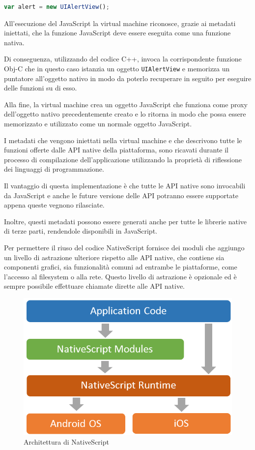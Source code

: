 \begin{lstlisting}[language=JavaScript, caption=Esempio di creazione di un oggetto nativo con NativeScript]
var alert = new UIAlertView();
\end{lstlisting}

All'esecuzione del JavaScript la virtual machine riconosce, grazie ai metadati iniettati, che la funzione JavaScript deve essere eseguita come una funzione nativa.

Di conseguenza, utilizzando del codice C++, invoca la corrispondente funzione Obj-C che in questo caso istanzia un oggetto \texttt{UIAlertView} e memorizza un puntatore all'oggetto nativo in modo da poterlo recuperare in seguito per eseguire delle funzioni su di esso.

Alla fine, la virtual machine crea un oggetto JavaScript che funziona come proxy dell'oggetto nativo precedentemente creato e lo ritorna in modo che possa essere memorizzato e utilizzato come un normale oggetto JavaScript.

I metadati che vengono iniettati nella virtual machine e che descrivono tutte le funzioni offerte dalle API native della piattaforma, sono ricavati durante il processo di compilazione dell'applicazione utilizzando la proprietà di \gls{riflessione} dei linguaggi di programmazione.

Il vantaggio di questa implementazione è che tutte le API native sono invocabili da JavaScript e anche le future versione delle API potranno essere supportate appena queste vegnono rilasciate.

Inoltre, questi metadati possono essere generati anche per tutte le librerie native di terze parti, rendendole disponibili in JavaScript.

Per permettere il riuso del codice NativeScript fornisce dei moduli che aggiungo un livello di astrazione ulteriore rispetto alle API native, che contiene sia componenti grafici, sia funzionalità comuni ad entrambe le piattaforme, come l'accesso al filesystem o alla rete.
Questo livello di astrazione è opzionale ed è sempre possibile effettuare chiamate dirette alle API native.

\begin{figure}[htp]
\centering
\includegraphics[width=\textwidth/2]{../immagini/ns-architecture}
\caption{Architettura di NativeScript}  
\end{figure}
\FloatBarrier

